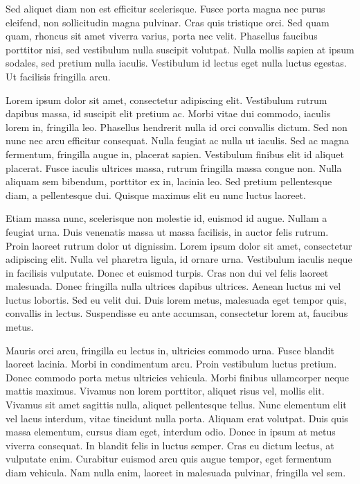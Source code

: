 \documentclass{article}
\begin{document}
	Sed aliquet diam non est efficitur scelerisque. Fusce porta magna nec purus eleifend, non sollicitudin magna pulvinar. Cras quis tristique orci. Sed quam quam, rhoncus sit amet viverra varius, porta nec velit. Phasellus faucibus porttitor nisi, sed vestibulum nulla suscipit volutpat. Nulla mollis sapien at ipsum sodales, sed pretium nulla iaculis. Vestibulum id lectus eget nulla luctus egestas. Ut facilisis fringilla arcu.
	
	Lorem ipsum dolor sit amet, consectetur adipiscing elit. Vestibulum rutrum dapibus massa, id suscipit elit pretium ac. Morbi vitae dui commodo, iaculis lorem in, fringilla leo. Phasellus hendrerit nulla id orci convallis dictum. Sed non nunc nec arcu efficitur consequat. Nulla feugiat ac nulla ut iaculis. Sed ac magna fermentum, fringilla augue in, placerat sapien. Vestibulum finibus elit id aliquet placerat. Fusce iaculis ultrices massa, rutrum fringilla massa congue non. Nulla aliquam sem bibendum, porttitor ex in, lacinia leo. Sed pretium pellentesque diam, a pellentesque dui. Quisque maximus elit eu nunc luctus laoreet.
	
	Etiam massa nunc, scelerisque non molestie id, euismod id augue. Nullam a feugiat urna. Duis venenatis massa ut massa facilisis, in auctor felis rutrum. Proin laoreet rutrum dolor ut dignissim. Lorem ipsum dolor sit amet, consectetur adipiscing elit. Nulla vel pharetra ligula, id ornare urna. Vestibulum iaculis neque in facilisis vulputate. Donec et euismod turpis. Cras non dui vel felis laoreet malesuada. Donec fringilla nulla ultrices dapibus ultrices. Aenean luctus mi vel luctus lobortis. Sed eu velit dui. Duis lorem metus, malesuada eget tempor quis, convallis in lectus. Suspendisse eu ante accumsan, consectetur lorem at, faucibus metus.
	
	Mauris orci arcu, fringilla eu lectus in, ultricies commodo urna. Fusce blandit laoreet lacinia. Morbi in condimentum arcu. Proin vestibulum luctus pretium. Donec commodo porta metus ultricies vehicula. Morbi finibus ullamcorper neque mattis maximus. Vivamus non lorem porttitor, aliquet risus vel, mollis elit. Vivamus sit amet sagittis nulla, aliquet pellentesque tellus. Nunc elementum elit vel lacus interdum, vitae tincidunt nulla porta. Aliquam erat volutpat. Duis quis massa elementum, cursus diam eget, interdum odio. Donec in ipsum at metus viverra consequat. In blandit felis in luctus semper. Cras eu dictum lectus, at vulputate enim. Curabitur euismod arcu quis augue tempor, eget fermentum diam vehicula. Nam nulla enim, laoreet in malesuada pulvinar, fringilla vel sem.
	
\end{document}
